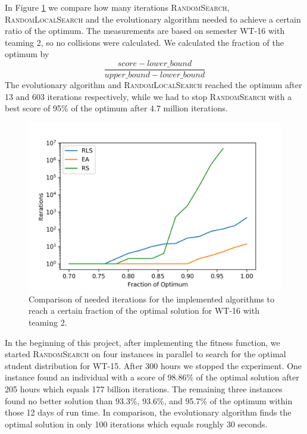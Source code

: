 \documentclass[12pt,a4paper]{article}
\begin{document}
 In Figure \ref{fig:wt_16} we compare how many iterations \textsc{RandomSearch}, \textsc{RandomLocalSearch} and the evolutionary algorithm needed to achieve a certain ratio of the optimum. The measurements are based on semester WT-16 with teaming 2, so no collisions were calculated. 
 We calculated the fraction of the optimum by
 $$\frac{score - lower\_bound}{upper\_bound - lower\_bound}$$
 The evolutionary algorithm and \textsc{RandomLocalSearch} reached the optimum after 13 and 603 iterations respectively, while we had to stop \textsc{RandomSearch} with a best score of 95\% of the optimum after 4.7 million iterations.
 
 \begin{center}
  \begin{figure}
    \centering
    \includegraphics[width=\textwidth]{WT-16_T2.png}
    \caption{Comparison of needed iterations for the implemented algorithms to reach a certain fraction of the optimal solution for WT-16 with teaming 2.}
    \label{fig:wt_16}
\end{figure} 
 \end{center}
 
 In the beginning of this project, after implementing the fitness function, we started \textsc{RandomSearch} on four instances in parallel to search for the optimal student distribution for WT-15. After 300 hours we stopped the experiment. One instance found an individual with a score of 98.86\% of the optimal solution after 205 hours which equals 177 billion iterations. The remaining three instances found no better solution than 93.3\%, 93.6\%, and 95.7\% of the optimum within those 12 days of run time. In comparison, the evolutionary algorithm finds the optimal solution in only 100 iterations which equals roughly 30 seconds.
 
\end{document}
